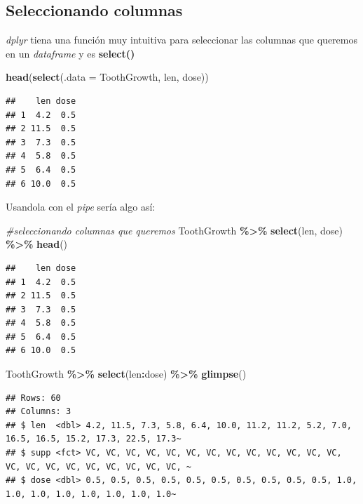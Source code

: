 \documentclass[
]{book}
\newenvironment{Shaded}{\begin{snugshade}}{\end{snugshade}}
\newcommand{\AttributeTok}[1]{\textcolor[rgb]{0.13,0.29,0.53}{#1}}
\newcommand{\CommentTok}[1]{\textcolor[rgb]{0.56,0.35,0.01}{\textit{#1}}}
\newcommand{\FunctionTok}[1]{\textcolor[rgb]{0.13,0.29,0.53}{\textbf{#1}}}
\newcommand{\NormalTok}[1]{#1}
\newcommand{\SpecialCharTok}[1]{\textcolor[rgb]{0.81,0.36,0.00}{\textbf{#1}}}
\begin{document}
\subsection{Seleccionando columnas}\label{seleccionando-columnas-1}

\emph{dplyr} tiena una función muy intuitiva para seleccionar las columnas que queremos en un \emph{dataframe} y es \textbf{select()}

\begin{Shaded}
\begin{Highlighting}[]
\FunctionTok{head}\NormalTok{(}\FunctionTok{select}\NormalTok{(}\AttributeTok{.data =}\NormalTok{ ToothGrowth, len, dose))}
\end{Highlighting}
\end{Shaded}

\begin{verbatim}
##    len dose
## 1  4.2  0.5
## 2 11.5  0.5
## 3  7.3  0.5
## 4  5.8  0.5
## 5  6.4  0.5
## 6 10.0  0.5
\end{verbatim}

Usandola con el \emph{pipe} sería algo así:\\

\begin{Shaded}
\begin{Highlighting}[]
\CommentTok{\#seleccionando columnas que queremos}
\NormalTok{ToothGrowth }\SpecialCharTok{\%\textgreater{}\%} \FunctionTok{select}\NormalTok{(len, dose) }\SpecialCharTok{\%\textgreater{}\%} \FunctionTok{head}\NormalTok{()}
\end{Highlighting}
\end{Shaded}

\begin{verbatim}
##    len dose
## 1  4.2  0.5
## 2 11.5  0.5
## 3  7.3  0.5
## 4  5.8  0.5
## 5  6.4  0.5
## 6 10.0  0.5
\end{verbatim}

\begin{Shaded}
\begin{Highlighting}[]
\NormalTok{ToothGrowth }\SpecialCharTok{\%\textgreater{}\%} \FunctionTok{select}\NormalTok{(len}\SpecialCharTok{:}\NormalTok{dose) }\SpecialCharTok{\%\textgreater{}\%} \FunctionTok{glimpse}\NormalTok{()}
\end{Highlighting}
\end{Shaded}

\begin{verbatim}
## Rows: 60
## Columns: 3
## $ len  <dbl> 4.2, 11.5, 7.3, 5.8, 6.4, 10.0, 11.2, 11.2, 5.2, 7.0, 16.5, 16.5, 15.2, 17.3, 22.5, 17.3~
## $ supp <fct> VC, VC, VC, VC, VC, VC, VC, VC, VC, VC, VC, VC, VC, VC, VC, VC, VC, VC, VC, VC, VC, VC, ~
## $ dose <dbl> 0.5, 0.5, 0.5, 0.5, 0.5, 0.5, 0.5, 0.5, 0.5, 0.5, 1.0, 1.0, 1.0, 1.0, 1.0, 1.0, 1.0, 1.0~
\end{verbatim}
\end{document}
